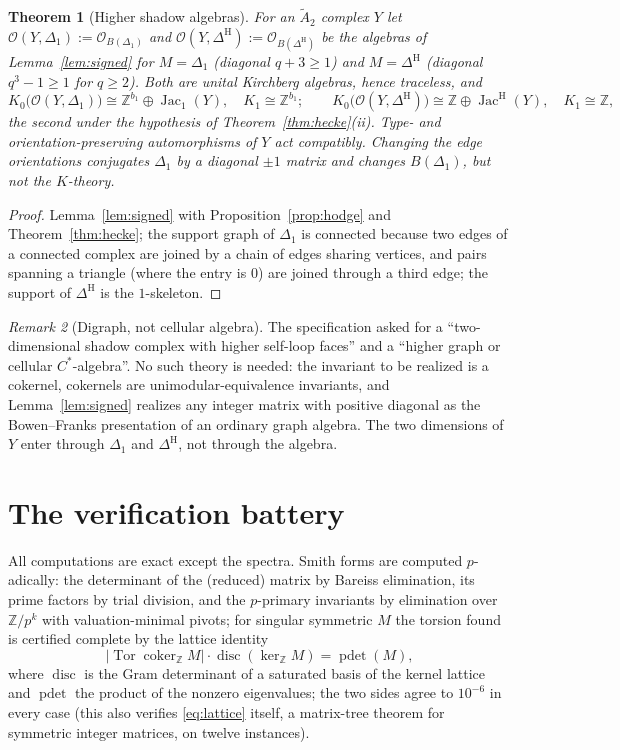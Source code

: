 \documentclass[11pt]{amsart}
\numberwithin{equation}{section}
\newtheorem{theorem}{Theorem}[section]
\theoremstyle{definition}
\theoremstyle{remark}
\newtheorem{remark}[theorem]{Remark}
\newcommand{\Z}{\mathbb{Z}}
\newcommand{\cO}{\mathcal{O}}
\newcommand{\Jac}{\operatorname{Jac}}
\newcommand{\coker}{\operatorname{coker}}
\newcommand{\Tor}{\operatorname{Tor}}
\newcommand{\Atwo}{\widetilde A_2}
\newcommand{\DeltaH}{\Delta^{\mathrm{H}}}
\newcommand{\JacH}{\Jac^{\mathrm{H}}}
\begin{document}
\begin{theorem}[Higher shadow algebras]\label{thm:shadow}
For an $\Atwo$ complex $Y$ let $\cO(Y,\Delta_1):=\cO_{B(\Delta_1)}$ and
$\cO(Y,\DeltaH):=\cO_{B(\DeltaH)}$ be the algebras of Lemma~\ref{lem:signed} for $M=\Delta_1$
(diagonal $q+3\ge1$) and $M=\DeltaH$ (diagonal $q^{3}-1\ge1$ for $q\ge2$). Both are unital
Kirchberg algebras, hence traceless, and
\[
K_0\bigl(\cO(Y,\Delta_1)\bigr)\cong\Z^{b_1}\oplus\Jac_1(Y),\quad K_1\cong\Z^{b_1};\qquad
K_0\bigl(\cO(Y,\DeltaH)\bigr)\cong\Z\oplus\JacH(Y),\quad K_1\cong\Z ,
\]
the second under the hypothesis of Theorem~\ref{thm:hecke}(ii). Type- and
orientation-preserving automorphisms of $Y$ act compatibly. Changing the edge orientations
conjugates $\Delta_1$ by a diagonal $\pm1$ matrix and changes $B(\Delta_1)$, but not the
$K$-theory.
\end{theorem}

\begin{proof}
Lemma~\ref{lem:signed} with Proposition~\ref{prop:hodge} and Theorem~\ref{thm:hecke}; the
support graph of $\Delta_1$ is connected because two edges of a connected complex are joined
by a chain of edges sharing vertices, and pairs spanning a triangle (where the entry is
$0$) are joined through a third edge; the support of $\DeltaH$ is the $1$-skeleton.
\end{proof}

\begin{remark}[Digraph, not cellular algebra]\label{rem:digraph}
The specification asked for a ``two-dimensional shadow complex with higher self-loop faces''
and a ``higher graph or cellular $C^*$-algebra''. No such theory is needed: the invariant to
be realized is a cokernel, cokernels are unimodular-equivalence invariants, and
Lemma~\ref{lem:signed} realizes any integer matrix with positive diagonal as the
Bowen--Franks presentation of an ordinary graph algebra. The two dimensions of $Y$ enter
through $\Delta_1$ and $\DeltaH$, not through the algebra.
\end{remark}

\section{The verification battery}\label{sec:battery}

All computations are exact except the spectra. Smith forms are computed $p$-adically:
the determinant of the (reduced) matrix by Bareiss elimination, its prime factors by trial
division, and the $p$-primary invariants by elimination over $\Z/p^{k}$ with
valuation-minimal pivots; for singular symmetric $M$ the torsion found is certified
complete by the lattice identity
\begin{equation}\label{eq:lattice}
|\Tor\coker_\Z M|\cdot\operatorname{disc}(\ker_\Z M)=\operatorname{pdet}(M),
\end{equation}
where $\operatorname{disc}$ is the Gram determinant of a saturated basis of the kernel
lattice and $\operatorname{pdet}$ the product of the nonzero eigenvalues; the two sides
agree to $10^{-6}$ in every case (this also verifies \eqref{eq:lattice} itself, a
matrix-tree theorem for symmetric integer matrices, on twelve instances).
\end{document}
